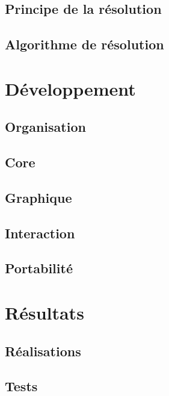 \documentclass[a4paper,10pt]{report}
\begin{document}
\chapter{Principe de la résolution}

\chapter{Algorithme de résolution}


\part{Développement}
\chapter{Organisation}

\chapter{Core}\label{ch6}

\chapter{Graphique}

\chapter{Interaction}

\chapter{Portabilité}


\part{Résultats}
\chapter{Réalisations}

\chapter{Tests}\label{Tests}


\listoffigures
\listoftables
\lstlistoflistings

\printindex
\end{document}
